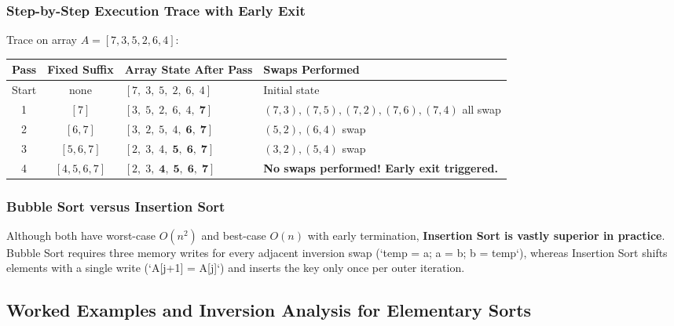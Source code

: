 \documentclass[11pt,a4paper]{article}
\begin{document}
\subsubsection{Step-by-Step Execution Trace with Early Exit}
Trace on array $A = [7, 3, 5, 2, 6, 4]$:
\begin{center}
\begin{tabular}{c c l p{6.5cm}}
\toprule
\textbf{Pass} & \textbf{Fixed Suffix} & \textbf{Array State After Pass} & \textbf{Swaps Performed} \\
\midrule
Start & none & $[7,\; 3,\; 5,\; 2,\; 6,\; 4]$ & Initial state \\
1 & $[7]$ & $[3,\; 5,\; 2,\; 6,\; 4,\; \mathbf{7}]$ & $(7,3), (7,5), (7,2), (7,6), (7,4)$ all swap \\
2 & $[6, 7]$ & $[3,\; 2,\; 5,\; 4,\; \mathbf{6},\; \mathbf{7}]$ & $(5,2), (6,4)$ swap \\
3 & $[5, 6, 7]$ & $[2,\; 3,\; 4,\; \mathbf{5},\; \mathbf{6},\; \mathbf{7}]$ & $(3,2), (5,4)$ swap \\
4 & $[4, 5, 6, 7]$ & $[2,\; 3,\; \mathbf{4},\; \mathbf{5},\; \mathbf{6},\; \mathbf{7}]$ & \textbf{No swaps performed! Early exit triggered.} \\
\bottomrule
\end{tabular}
\end{center}

\subsubsection{Bubble Sort versus Insertion Sort}
Although both have worst-case $O(n^2)$ and best-case $O(n)$ with early termination, \textbf{Insertion Sort is vastly superior in practice}. Bubble Sort requires three memory writes for every adjacent inversion swap (`temp = a; a = b; b = temp`), whereas Insertion Sort shifts elements with a single write (`A[j+1] = A[j]`) and inserts the key only once per outer iteration.

\subsection{Worked Examples and Inversion Analysis for Elementary Sorts}
\end{document}
